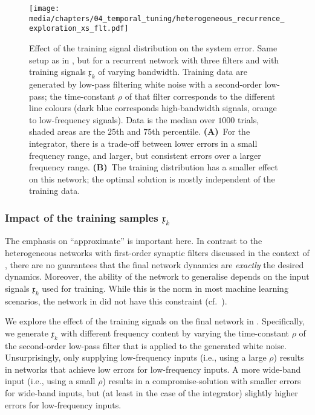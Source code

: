 \begin{figure}
	\centering
	\texttt{[image: media/chapters/04\_temporal\_tuning/heterogeneous\_recurrence\_exploration\_xs\_flt.pdf]}
	\caption[Effect of the training signal distribution on the system error]{Effect of the training signal distribution on the system error.
	Same setup as in , but for a recurrent network with three filters and with training signals $\mathfrak{x}_k$ of varying bandwidth.
	Training data are generated by low-pass filtering white noise with a second-order low-pass; the time-constant $\rho$ of that filter corresponds to the different line colours (dark blue corresponds high-bandwidth signals, orange to low-frequency signals).
	Data is the median over $1000$ trials, shaded areas are the $25$th and $75$th percentile.
	\textbf{(A)}~For the integrator, there is a trade-off between lower errors in a small frequency range, and larger, but consistent errors  over a larger frequency range.
	\textbf{(B)}~The training distribution has a smaller effect on this network; the optimal solution is mostly independent of the training data.
	}
	\label{fig:heterogeneous_recurrence_exploration_xs_flt}
\end{figure}

\subsubsection{Impact of the training samples $\mathfrak{x}_k$}
The emphasis on \enquote{approximate} is important here.
In contrast to the heterogeneous networks with first-order synaptic filters discussed in the context of , there are no guarantees that the final network dynamics are \emph{exactly} the desired dynamics.
Moreover, the ability of the network to generalise depends on the input signals $\mathfrak{x}_k$ used for training.
While this is the norm in most machine learning scenarios, the network in  did not have this constraint (cf.~).

We explore the effect of the training signals on the final network in .
Specifically, we generate $\mathfrak{x}_k$ with different frequency content by varying the time-constant $\rho$ of the second-order low-pass filter that is applied to the generated white noise.
Unsurprisingly, only supplying low-frequency inputs (i.e., using a large $\rho$) results in networks that achieve low errors for low-frequency inputs.
A more wide-band input (i.e., using a small $\rho$) results in a compromise-solution with smaller errors for wide-band inputs, but (at least in the case of the integrator) slightly higher errors for low-frequency inputs.

